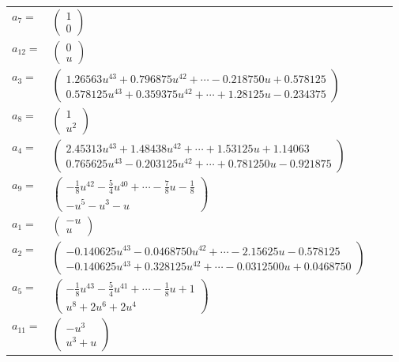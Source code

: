 \documentclass[1p]{elsarticle_modified}
\theoremstyle{definition}
\begin{document}
\begin{tabular}{m{7pt} m{180pt} m{7pt} m{180pt} }
\flushright $a_{7}=$&$\begin{pmatrix}1\\0\end{pmatrix}$ \\
\flushright $a_{12}=$&$\begin{pmatrix}0\\u\end{pmatrix}$ \\
\flushright $a_{3}=$&$\begin{pmatrix}1.26563 u^{43}+0.796875 u^{42}+\cdots-0.218750 u+0.578125\\0.578125 u^{43}+0.359375 u^{42}+\cdots+1.28125 u-0.234375\end{pmatrix}$ \\
\flushright $a_{8}=$&$\begin{pmatrix}1\\u^2\end{pmatrix}$ \\
\flushright $a_{4}=$&$\begin{pmatrix}2.45313 u^{43}+1.48438 u^{42}+\cdots+1.53125 u+1.14063\\0.765625 u^{43}-0.203125 u^{42}+\cdots+0.781250 u-0.921875\end{pmatrix}$ \\
\flushright $a_{9}=$&$\begin{pmatrix}-\frac{1}{8} u^{42}-\frac{5}{4} u^{40}+\cdots-\frac{7}{8} u-\frac{1}{8}\\- u^5- u^3- u\end{pmatrix}$ \\
\flushright $a_{1}=$&$\begin{pmatrix}- u\\u\end{pmatrix}$ \\
\flushright $a_{2}=$&$\begin{pmatrix}-0.140625 u^{43}-0.0468750 u^{42}+\cdots-2.15625 u-0.578125\\-0.140625 u^{43}+0.328125 u^{42}+\cdots-0.0312500 u+0.0468750\end{pmatrix}$ \\
\flushright $a_{5}=$&$\begin{pmatrix}-\frac{1}{8} u^{43}-\frac{5}{4} u^{41}+\cdots-\frac{1}{8} u+1\\u^8+2 u^6+2 u^4\end{pmatrix}$ \\
\flushright $a_{11}=$&$\begin{pmatrix}- u^3\\u^3+u\end{pmatrix}$ \\

\end{tabular}
\end{document}
